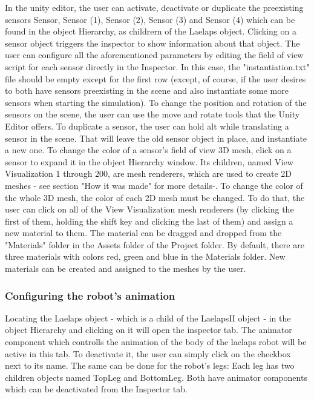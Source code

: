 \documentclass{article}
\begin{document}
In the unity editor, the user can activate, deactivate or duplicate the preexisting sensors Sensor, Sensor (1), Sensor (2), Sensor (3) and Sensor (4) which can be found in the object Hierarchy, as childrern of the Laelaps object. Clicking on a sensor object triggers the inspector to show information about that object. The user can configure all the aforementioned parameters by editing the field of view script for each sensor directly in the Inspector. In this case, the "instantiation.txt" file should be empty except for the first row (except, of course, if the user desires to both have sensors preexisting in the scene and also instantiate some more sensors when starting the simulation). To change the position and rotation of the sensors on the scene, the user can use the move and rotate tools that the Unity Editor offers. To duplicate a sensor, the user can hold alt while translating a sensor in the scene. That will leave the old sensor object in place, and instantiate a new one.
To change the color of a sensor's field of view 3D mesh, click on a sensor to expand it in the object Hierarchy window. Its children, named View Visualization 1 through 200, are mesh renderers, which are used to create 2D meshes - see section "How it was made" for more details-. To change the color of the whole 3D mesh, the color of each 2D mesh must be changed. To do that, the user can click on all of the View Visualization mesh renderers (by clicking the first of them, holding the shift key and clicking the last of them) and assign a new material to them. The material can be dragged and dropped from the "Materials" folder in the Assets folder of the Project folder. By default, there are three materials with colors red, green and blue in the Materials folder. New materials can be created and assigned to the meshes by the user.

\subsubsection{Configuring the robot's animation}

Locating the Laelaps object - which is a child of the LaelapsII object - in the object Hierarchy and clicking on it will open the inspector tab. The animator component which controlls the animation of the body of the laelaps robot will be active in this tab. To deactivate it, the user can simply click on the checkbox next to its name. The same can be done for the robot's legs: Each leg has two children objects named TopLeg and BottomLeg. Both have animator components which can be deactivated from the Inspector tab.
\end{document}
